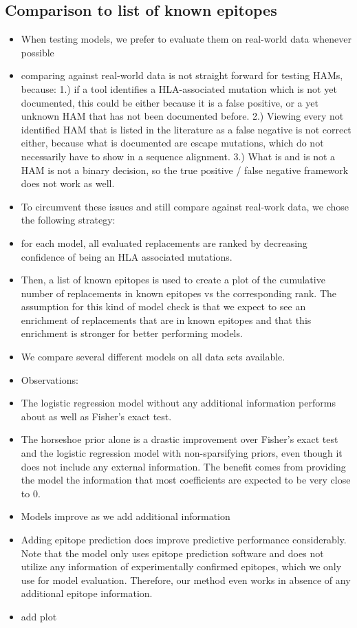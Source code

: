 \documentclass[fleqn,11pt]{SelfArx} %
\begin{document}
\subsection*{Comparison to list of known epitopes}

\begin{itemize}
  \item When testing models, we prefer to evaluate them on real-world data whenever possible
  \item comparing against real-world data is not straight forward for testing HAMs, because: 1.) if a tool identifies a HLA-associated mutation which is not yet documented, this could be either because it is a false positive, or a yet unknown HAM that has not been documented before. 2.) Viewing every not identified HAM that is listed in the literature as a false negative is not correct either, because what is documented are escape mutations, which do not necessarily have to show in a sequence alignment. 3.) What is and is not a HAM is not a binary decision, so the true positive / false negative framework does not work as well.
  \item To circumvent these issues and still compare against real-work data, we chose the following strategy:
  \item for each model, all evaluated replacements are ranked by decreasing confidence of being an HLA associated mutations.
  \item Then, a list of known epitopes is used to create a plot of the cumulative number of replacements in known epitopes vs the corresponding rank. The assumption for this kind of model check is that we expect to see an 
  enrichment of replacements that are in known epitopes and that this enrichment is stronger for better performing models.
  \item We compare several different models on all data sets available. 
  \item Observations:
  \item The logistic regression model without any additional information performs about as well as Fisher's exact test.
  \item The horseshoe prior alone is a drastic improvement over Fisher's exact test and the logistic regression model with non-sparsifying priors, even though it does not include any external information. The benefit comes from providing the model the information that most coefficients are expected to be very close to 0.
  \item Models improve as we add additional information
  \item Adding epitope prediction does improve predictive performance considerably. Note that the model only uses epitope prediction software and does not utilize any information of experimentally confirmed epitopes, which we only use for model evaluation. Therefore, our method even works in absence of any additional epitope information.
  \item add plot
\end{itemize}
\end{document}
